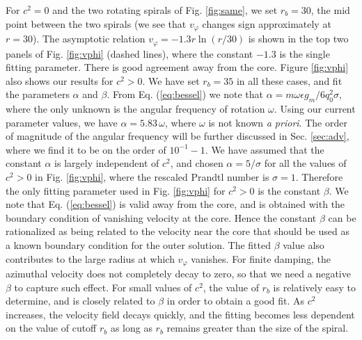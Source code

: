 \documentclass[preprint,prx,floatfix]{revtex4-1}
\begin{document}
For $c^{2} = 0$ and the two rotating spirals of Fig. \ref{fig:same}, we set $r_{b} = 30$, the mid point between the two spirals (we see that $v_\varphi$ changes sign approximately at $r=30$). The asymptotic relation $v_\varphi = -1.3 r\ln(r/30)$ is shown in the top two panels of Fig. \ref{fig:vphi} (dashed lines), where the constant $-1.3$ is the single fitting parameter. There is good agreement away from the core. Figure \ref{fig:vphi} also shows our results for $c^{2} > 0$. We have set $r_{b} = 35$ in all these cases, and fit the parameters $\alpha$ and $\beta$. From Eq. (\ref{eq:bessel}) we note that $\alpha = m\omega\epsilon g_m/6q_0^2\sigma$, where the only unknown is the angular frequency of rotation $\omega$. Using our current parameter values, we have $\alpha =  5.83\,\omega$, where $\omega$ is not known \emph{a priori}. The order of magnitude of the angular frequency will be further discussed in Sec. \ref{sec:adv}, where we find it to be on the order of $10^{-1}-1$. We have assumed that the constant $\alpha$ is largely independent of $c^{2}$, and chosen $\alpha = 5/\sigma$ for all the values of $c^{2} > 0$ in Fig. \ref{fig:vphi}, where the rescaled Prandtl number is $\sigma = 1$. Therefore the only fitting parameter used in Fig. \ref{fig:vphi} for $c^{2} > 0$ is the constant $\beta$.  We note that Eq. (\ref{eq:bessel}) is valid away from the core, and is obtained with the boundary condition of vanishing velocity at the core. Hence the constant $\beta$ can be rationalized as being related to the velocity near the core that should be used as a known boundary condition for the outer solution. The fitted $\beta$ value also contributes to the large radius at which $v_{\varphi}$ vanishes. For finite damping, the azimuthal velocity does not completely decay to zero, so that we need a negative $\beta$ to capture such effect. For small values of $c^{2}$, the value of $r_{b}$ is relatively easy to determine, and is closely related to $\beta$ in order to obtain a good fit. As $c^{2}$ increases, the velocity field decays quickly, and the fitting becomes less dependent on the value of cutoff $r_{b}$ as long as $r_b$ remains greater than the size of the spiral.
\end{document}
